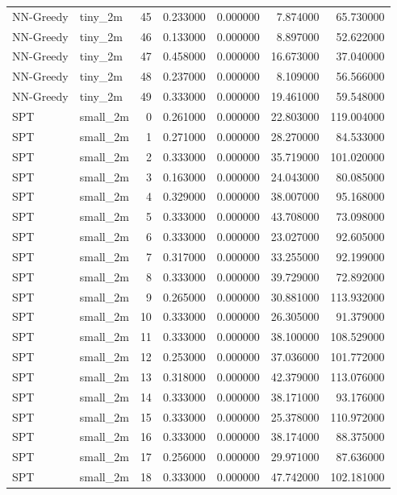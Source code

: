 \begin{tabular}{llrrrrr}
NN-Greedy & tiny_2m & 45 & 0.233000 & 0.000000 & 7.874000 & 65.730000 \\
NN-Greedy & tiny_2m & 46 & 0.133000 & 0.000000 & 8.897000 & 52.622000 \\
NN-Greedy & tiny_2m & 47 & 0.458000 & 0.000000 & 16.673000 & 37.040000 \\
NN-Greedy & tiny_2m & 48 & 0.237000 & 0.000000 & 8.109000 & 56.566000 \\
NN-Greedy & tiny_2m & 49 & 0.333000 & 0.000000 & 19.461000 & 59.548000 \\
SPT & small_2m & 0 & 0.261000 & 0.000000 & 22.803000 & 119.004000 \\
SPT & small_2m & 1 & 0.271000 & 0.000000 & 28.270000 & 84.533000 \\
SPT & small_2m & 2 & 0.333000 & 0.000000 & 35.719000 & 101.020000 \\
SPT & small_2m & 3 & 0.163000 & 0.000000 & 24.043000 & 80.085000 \\
SPT & small_2m & 4 & 0.329000 & 0.000000 & 38.007000 & 95.168000 \\
SPT & small_2m & 5 & 0.333000 & 0.000000 & 43.708000 & 73.098000 \\
SPT & small_2m & 6 & 0.333000 & 0.000000 & 23.027000 & 92.605000 \\
SPT & small_2m & 7 & 0.317000 & 0.000000 & 33.255000 & 92.199000 \\
SPT & small_2m & 8 & 0.333000 & 0.000000 & 39.729000 & 72.892000 \\
SPT & small_2m & 9 & 0.265000 & 0.000000 & 30.881000 & 113.932000 \\
SPT & small_2m & 10 & 0.333000 & 0.000000 & 26.305000 & 91.379000 \\
SPT & small_2m & 11 & 0.333000 & 0.000000 & 38.100000 & 108.529000 \\
SPT & small_2m & 12 & 0.253000 & 0.000000 & 37.036000 & 101.772000 \\
SPT & small_2m & 13 & 0.318000 & 0.000000 & 42.379000 & 113.076000 \\
SPT & small_2m & 14 & 0.333000 & 0.000000 & 38.171000 & 93.176000 \\
SPT & small_2m & 15 & 0.333000 & 0.000000 & 25.378000 & 110.972000 \\
SPT & small_2m & 16 & 0.333000 & 0.000000 & 38.174000 & 88.375000 \\
SPT & small_2m & 17 & 0.256000 & 0.000000 & 29.971000 & 87.636000 \\
SPT & small_2m & 18 & 0.333000 & 0.000000 & 47.742000 & 102.181000 \\

\end{tabular}
